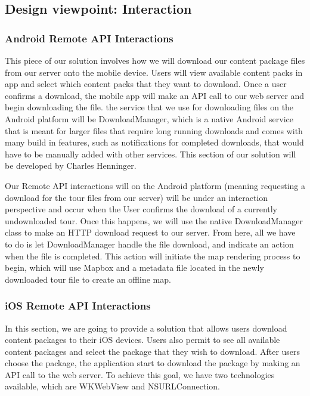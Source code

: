 \documentclass[letterpaper, 10pt,titlepage]{article}
\begin{document}
\subsection{Design viewpoint: Interaction}

\subsubsection{Android Remote API Interactions}
This piece of our solution involves how we will download our content package files from our server onto the mobile device. Users will view available content packs in app and select which content packs that they want to download. Once a user confirms a download, the mobile app will make an API call to our web server and begin downloading the file. the service that we use for downloading files on the Android platform will be DownloadManager, which is a native Android service that is meant for larger files that require long running downloads and comes with many build in features, such as notifications for completed downloads, that would have to be manually added with other services. This section of our solution will be developed by Charles Henninger.


Our Remote API interactions will on the Android platform (meaning requesting a download for the tour files from our server) will be under an interaction perspective and occur when the User confirms the download of a currently undownloaded tour. Once this happens, we will use the native DownloadManager class to make an HTTP download request to our server. From here, all we have to do is let DownloadManager handle the file download, and indicate an action when the file is completed. This action will initiate the map rendering process to begin, which will use Mapbox and a metadata file located in the newly downloaded tour file to create an offline map.



\subsubsection{iOS Remote API Interactions}
In this section, we are going to provide a solution that allows users download content packages to their iOS devices. Users also permit to see all available content packages and select the package that they wish to download. After users choose the package, the application start to download the package by making an API call to the web server. To achieve this goal, we have two technologies available, which are WKWebView and NSURLConnection.
\end{document}
